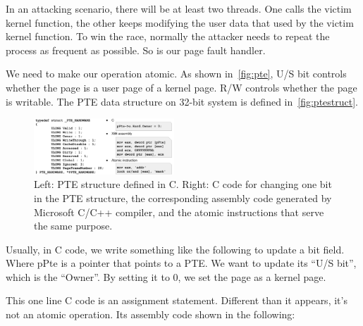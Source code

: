 In an attacking scenario, there will be at least two threads. One calls the victim kernel function, the other keeps modifying the user data that used by the victim kernel function. To win the race, normally the attacker needs to repeat the process as frequent as possible. So is our page fault handler. 

We need to make our operation atomic. As shown in~\autoref{fig:pte}, U/S bit controls whether the page is a user page of a kernel page. R/W controls whether the page is writable. The PTE data structure on 32-bit system is defined in~\autoref{fig:ptestruct}.

%

\begin{figure}[th]
  \includegraphics[width=0.47\textwidth]{figures/ptestructcode}
  \centering
  \caption{Left: PTE structure defined in C. Right: C code for changing one bit in the PTE structure, the corresponding assembly code generated by Microsoft C/C++ compiler, and the atomic instructions that serve the same purpose.}
  \label{fig:ptestruct}
\end{figure}

Usually, in C code, we write something like the following to update a bit field. Where pPte is a pointer that points to a PTE. We want to update its ``U/S bit'', which is the ``Owner''. By setting it to 0, we set the page as a kernel page. 


This one line C code is an assignment statement. Different than it appears, it's not an atomic operation. Its assembly code shown in the following:

